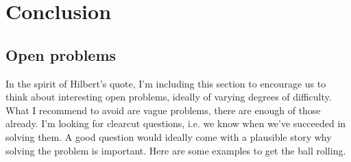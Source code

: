 \section{Conclusion}\label{conclusion}


\subsection{Open problems} 


In the spirit of Hilbert's quote, I'm including this section to
encourage us to think about interesting open problems, ideally of
varying degrees of difficulty. What I recommend to avoid are vague
problems, there are enough of those already. I'm looking for clearcut
questions, i.e. we know when we've succeeded in solving them.  A good
question would ideally come with a plausible story why solving the
problem is important.  Here are some examples to get the ball rolling.


